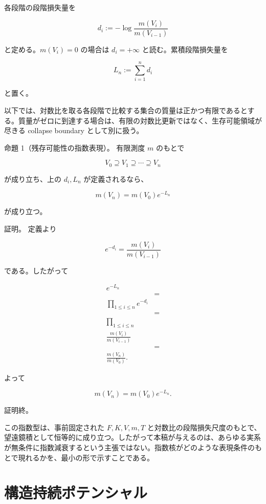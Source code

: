 \documentclass[12pt,a4paper]{article}
\begin{document}
各段階の段階損失量を

\[
d_{i} := -\log\frac{m(V_{i})}{m(V_{i-1})}
\]

と定める。\(m(V_{i})=0\) の場合は \(d_{i}=+\infty\) と読む。累積段階損失量を

\[
L_{n} := \sum_{i=1}^n d_{i}
\]

と置く。

以下では、対数比を取る各段階で比較する集合の質量は正かつ有限であるとする。質量がゼロに到達する場合は、有限の対数比更新ではなく、生存可能領域が尽きる collapse boundary として別に扱う。

命題 1（残存可能性の指数表現）。 有限測度 \(m\) のもとで

\[
V_0 \supseteq V_1 \supseteq \cdots \supseteq V_{n}
\]

が成り立ち、上の \(d_{i},L_{n}\) が定義されるなら、

\[
m(V_{n}) = m(V_0) e^{-L_{n}}
\]

が成り立つ。

証明。 定義より

\[
e^{-d_{i}}=\frac{m(V_{i})}{m(V_{i-1})}
\]

である。したがって

\[
\begin{aligned}
e^{-L_{n}} \\
&= \\
\prod_{1\le i\le n} e^{-d_{i}} \\
&= \\
\prod_{1\le i\le n} \\
\frac{m(V_{i})}{m(V_{i-1})} \\
&= \\
\frac{m(V_{n})}{m(V_0)}.
\end{aligned}
\]

よって

\[
m(V_{n}) = m(V_0)e^{-L_{n}}.
\]

証明終。

この指数型は、事前固定された \(F,K,V,m,T\) と対数比の段階損失尺度のもとで、望遠鏡積として恒等的に成り立つ。したがって本稿が与えるのは、あらゆる実系が無条件に指数減衰するという主張ではない。指数核がどのような表現条件のもとで現れるかを、最小の形で示すことである。

\section{構造持続ポテンシャル}\label{ux69cbux9020ux6301ux7d9aux30ddux30c6ux30f3ux30b7ux30e3ux30eb}
\end{document}
